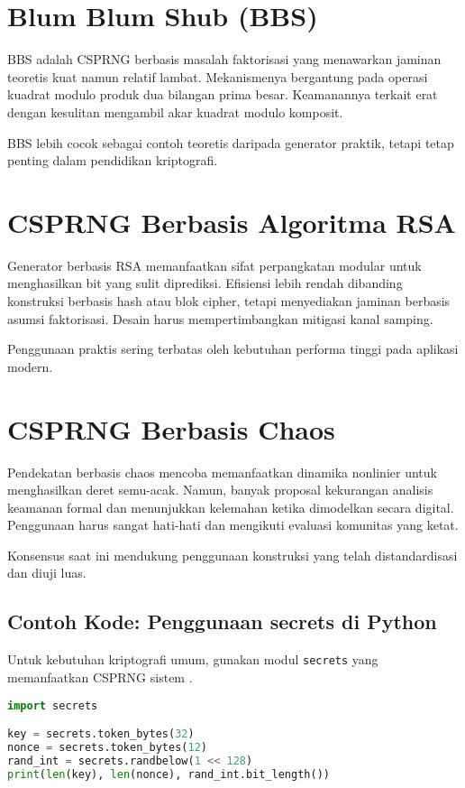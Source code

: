 \documentclass[../main.tex]{subfiles}
\begin{document}
\section{Blum Blum Shub (BBS)}
BBS adalah CSPRNG berbasis masalah faktorisasi yang menawarkan jaminan teoretis kuat namun relatif lambat. Mekanismenya bergantung pada operasi kuadrat modulo produk dua bilangan prima besar. Keamanannya terkait erat dengan kesulitan mengambil akar kuadrat modulo komposit.

BBS lebih cocok sebagai contoh teoretis daripada generator praktik, tetapi tetap penting dalam pendidikan kriptografi.

\section{CSPRNG Berbasis Algoritma RSA}
Generator berbasis RSA memanfaatkan sifat perpangkatan modular untuk menghasilkan bit yang sulit diprediksi. Efisiensi lebih rendah dibanding konstruksi berbasis hash atau blok cipher, tetapi menyediakan jaminan berbasis asumsi faktorisasi. Desain harus mempertimbangkan mitigasi kanal samping.

Penggunaan praktis sering terbatas oleh kebutuhan performa tinggi pada aplikasi modern.

\section{CSPRNG Berbasis Chaos}
Pendekatan berbasis chaos mencoba memanfaatkan dinamika nonlinier untuk menghasilkan deret semu-acak. Namun, banyak proposal kekurangan analisis keamanan formal dan menunjukkan kelemahan ketika dimodelkan secara digital. Penggunaan harus sangat hati-hati dan mengikuti evaluasi komunitas yang ketat.

Konsensus saat ini mendukung penggunaan konstruksi yang telah distandardisasi dan diuji luas.

\subsection{Contoh Kode: Penggunaan secrets di Python}
Untuk kebutuhan kriptografi umum, gunakan modul \texttt{secrets} yang memanfaatkan CSPRNG sistem \parencite{rfc4086}.

\begin{lstlisting}[language=Python, caption={Contoh penggunaan secrets}, label={lst:secrets}]
import secrets

key = secrets.token_bytes(32)
nonce = secrets.token_bytes(12)
rand_int = secrets.randbelow(1 << 128)
print(len(key), len(nonce), rand_int.bit_length())
\end{lstlisting}
\end{document}
